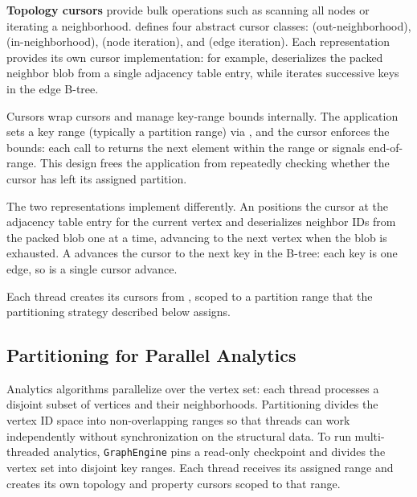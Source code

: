 \textbf{Topology cursors} provide bulk operations such as scanning all nodes or iterating a neighborhood.
\project{} defines four abstract cursor classes:  (out-neighborhood),  (in-neighborhood),  (node iteration), and  (edge iteration).
Each representation provides its own cursor implementation: for example,  deserializes the packed neighbor blob from a single adjacency table entry, while  iterates successive keys in the edge B-tree.

Cursors wrap \wt{} cursors and manage key-range bounds internally.
The application sets a key range (typically a partition range) via , and the cursor enforces the bounds: each call to  returns the next element within the range or signals end-of-range.
This design frees the application from repeatedly checking whether the cursor has left its assigned partition.

The two representations implement  differently.
An  positions the \wt{} cursor at the adjacency table entry for the current vertex and deserializes neighbor IDs from the packed blob one at a time, advancing to the next vertex when the blob is exhausted.
A  advances the \wt{} cursor to the next key in the B-tree: each key is one edge, so  is a single \wt{} cursor advance.

Each thread creates its cursors from , scoped to a partition range that the partitioning strategy described below assigns.

\subsection{Partitioning for Parallel Analytics}
\label{arch:api:partitioning}

Analytics algorithms parallelize over the vertex set: each thread processes a disjoint subset of vertices and their neighborhoods.
Partitioning divides the vertex ID space into non-overlapping ranges so that threads can work independently without synchronization on the structural data.
To run multi-threaded analytics, \texttt{GraphEngine} pins a read-only checkpoint and divides the vertex set into disjoint key ranges.
Each thread receives its assigned range and creates its own topology and property cursors scoped to that range.

